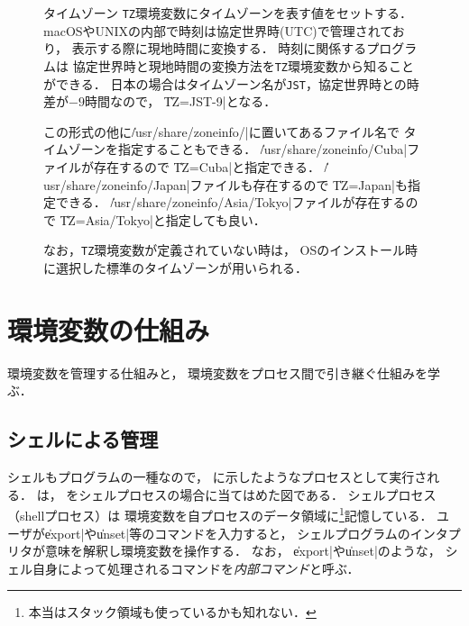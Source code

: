 \begin{figure}[btp]
\begin{itembox}[l]{タイムゾーン}
\texttt{TZ}環境変数にタイムゾーンを表す値をセットする．
macOSやUNIXの内部で時刻は協定世界時(UTC)で管理されており，
表示する際に現地時間に変換する．
時刻に関係するプログラムは
協定世界時と現地時間の変換方法を\texttt{TZ}環境変数から知ることができる．
日本の場合はタイムゾーン名が\texttt{JST}，協定世界時との時差が$-9$時間なので，
\|TZ=JST-9|となる．

この形式の他に\|/usr/share/zoneinfo/|に置いてあるファイル名で
タイムゾーンを指定することもできる．
\|/usr/share/zoneinfo/Cuba|ファイルが存在するので
\|TZ=Cuba|と指定できる．
\|/usr/share/zoneinfo/Japan|ファイルも存在するので
\|TZ=Japan|も指定できる．
\|/usr/share/zoneinfo/Asia/Tokyo|ファイルが存在するので
\|TZ=Asia/Tokyo|と指定しても良い．

なお，\texttt{TZ}環境変数が定義されていない時は，
OSのインストール時に選択した標準のタイムゾーンが用いられる．
\end{itembox}
\end{figure}

\newpage

\section{環境変数の仕組み}
環境変数を管理する仕組みと，
環境変数をプロセス間で引き継ぐ仕組みを学ぶ．

\subsection{シェルによる管理}
シェルもプログラムの一種なので，
に示したようなプロセスとして実行される．
は，
をシェルプロセスの場合に当てはめた図である．
シェルプロセス（shellプロセス）は
環境変数を自プロセスのデータ領域に\footnote{
本当はスタック領域も使っているかも知れない．}記憶している．
ユーザが\|export|や\|unset|等のコマンドを入力すると，
シェルプログラムのインタプリタが意味を解釈し環境変数を操作する．
なお，
\|export|や\|unset|のような，
シェル自身によって処理されるコマンドを\emph{内部コマンド}と呼ぶ．

